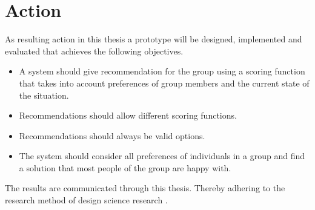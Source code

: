\section{Action}
\label{sec:Introduction:Action}


As resulting action in this thesis a prototype will be designed, implemented and evaluated that achieves the following objectives.
\begin{itemize}
    \item A system should give recommendation for the group using a scoring function that takes into account preferences of group members and the current state of the situation.
    \item Recommendations should allow different scoring functions.
    \item Recommendations should always be valid options.
    \item The system should consider all preferences of individuals in a group and find a solution that most people of the group are happy with.
\end{itemize}
The results are communicated through this thesis. Thereby adhering to the research method of design science research \cite{peffersDesignScienceResearch2007}.